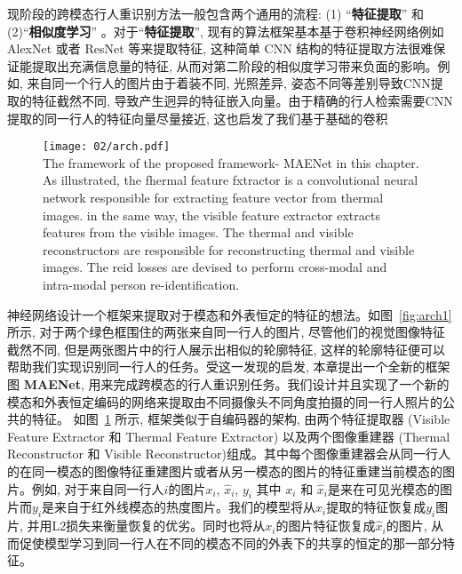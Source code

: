 现阶段的跨模态行人重识别方法一般包含两个通用的流程: (1) ``\textbf{特征提取}'' 和 (2)``\textbf{相似度学习}'' 。对于``\textbf{特征提取}'', 现有的算法框架基本基于卷积神经网络例如 AlexNet 或者 ResNet 等来提取特征, 这种简单 CNN 结构的特征提取方法很难保证能提取出充满信息量的特征, 从而对第二阶段的相似度学习带来负面的影响。例如, 来自同一个行人的图片由于着装不同, 光照差异, 姿态不同等差别导致CNN提取的特征截然不同, 导致产生迥异的特征嵌入向量。由于精确的行人检索需要CNN提取的同一行人的特征向量尽量接近, 这也启发了我们基于基础的卷积
\begin{figure}[!htp]
    \centering
    \texttt{[image: 02/arch.pdf]} \\
      {The framework of the proposed framework- MAENet in this chapter. As illustrated, the fhermal feature fxtractor is a convolutional neural network responsible for extracting feature vector from thermal images. in the same way, the visible feature extractor extracts features from the visible images. The thermal and visible reconstructors are responsible for reconstructing thermal and visible images. The reid losses are devised to perform cross-modal and intra-modal person re-identification.}   
      \label{fig:arch}
\end{figure} 
神经网络设计一个框架来提取对于模态和外表恒定的特征的想法。如图~\ref{fig:arch1}所示, 对于两个绿色框围住的两张来自同一行人的图片, 尽管他们的视觉图像特征截然不同, 但是两张图片中的行人展示出相似的轮廓特征, 这样的轮廓特征便可以帮助我们实现识别同一行人的任务。受这一发现的启发, 本章提出一个全新的框架图 \textbf{MAENet}, 用来完成跨模态的行人重识别任务。我们设计并且实现了一个新的模态和外表恒定编码的网络来提取由不同摄像头不同角度拍摄的同一行人照片的公共的特征。 如图~\ref{fig:arch} 所示, 框架类似于自编码器的架构, 由两个特征提取器 (Visible Feature Extractor 和 Thermal Feature Extractor) 以及两个图像重建器 (Thermal Reconstructor 和 Visible Reconstructor)组成。其中每个图像重建器会从同一行人的在同一模态的图像特征重建图片或者从另一模态的图片的特征重建当前模态的图片。例如, 对于来自同一行人$i$的图片$x_i$, $\hat{x}_i$, $y_i$ 其中 $x_i$ 和 $\hat{x}_i$是来在可见光模态的图片而$y_i$是来自于红外线模态的热度图片。我们的模型将从$x_i$提取的特征恢复成$y_i$图片, 并用L2损失来衡量恢复的优劣。同时也将从$x_i$的图片特征恢复成$\hat{x}_i$的图片, 从而促使模型学习到同一行人在不同的模态不同的外表下的共享的恒定的那一部分特征。
